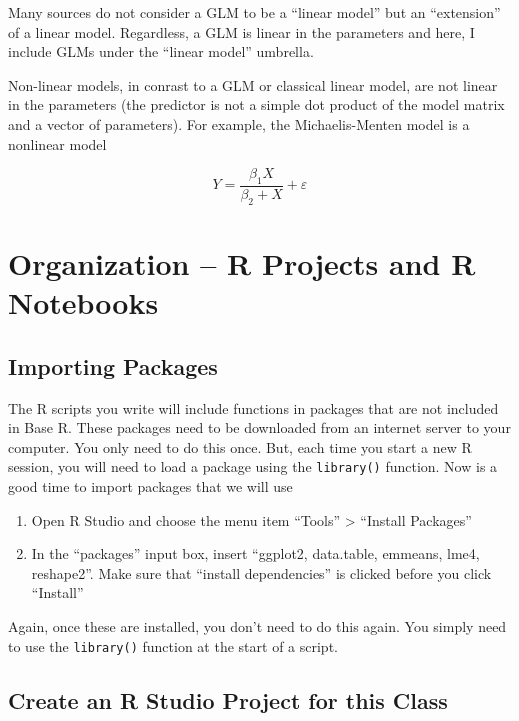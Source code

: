\documentclass[]{book}
\providecommand{\tightlist}{%
  \setlength{\itemsep}{0pt}\setlength{\parskip}{0pt}}
\theoremstyle{definition}
\theoremstyle{definition}
\theoremstyle{definition}
\theoremstyle{remark}
\begin{document}
Many sources do not consider a GLM to be a ``linear model'' but an
``extension'' of a linear model. Regardless, a GLM is linear in the
parameters and here, I include GLMs under the ``linear model'' umbrella.

Non-linear models, in conrast to a GLM or classical linear model, are
not linear in the parameters (the predictor is not a simple dot product
of the model matrix and a vector of parameters). For example, the
Michaelis-Menten model is a nonlinear model

\begin{equation}
Y = \frac{\beta_1 X}{\beta_2 + X} + \varepsilon
\end{equation}

\chapter{Organization -- R Projects and R
Notebooks}\label{organization-r-projects-and-r-notebooks}

\section{Importing Packages}\label{importing-packages}

The R scripts you write will include functions in packages that are not
included in Base R. These packages need to be downloaded from an
internet server to your computer. You only need to do this once. But,
each time you start a new R session, you will need to load a package
using the \texttt{library()} function. Now is a good time to import
packages that we will use

\begin{enumerate}
\def\labelenumi{\arabic{enumi}.}
\tightlist
\item
  Open R Studio and choose the menu item ``Tools'' \textgreater{}
  ``Install Packages''
\item
  In the ``packages'' input box, insert ``ggplot2, data.table, emmeans,
  lme4, reshape2''. Make sure that ``install dependencies'' is clicked
  before you click ``Install''
\end{enumerate}

Again, once these are installed, you don't need to do this again. You
simply need to use the \texttt{library()} function at the start of a
script.

\section{Create an R Studio Project for this
Class}\label{create-an-r-studio-project-for-this-class}
\end{document}
